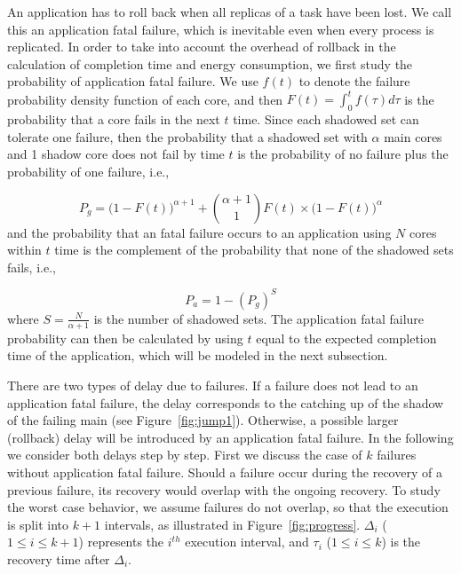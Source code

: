 An application has to roll back when all replicas of a task have been lost. We call this an application fatal failure, which is inevitable even when every process is replicated. 
In order to take into account the overhead of rollback in the calculation of completion time and energy consumption, we first 
study the probability of application fatal failure. 
We use 
$f(t)$ to denote the failure probability density function of each core, and then $F(t) = \int_0^tf(\tau)d\tau$ is the probability that a core fails in the next $t$ time. 
Since each shadowed set can tolerate one failure, 
then the probability that a shadowed set with $\alpha$ main cores and 1 shadow core does not fail by time $t$ is the probability of no failure plus the probability of one failure, i.e., 

\begin{equation}
	P_g = \Big(1-F(t)\Big)^{\alpha+1} + {{\alpha+1} \choose 1}F(t)\times \Big(1-F(t)\Big)^{\alpha}
\end{equation}
and the probability that an fatal failure occurs to an application using $N$ cores within $t$ time is the complement of the probability that
none of the shadowed sets fails, i.e.,

\begin{equation}
	P_a = 1 - ({P_g})^{S}
\end{equation}
where $S=\frac{N}{\alpha+1}$ is the number of shadowed sets.
The application fatal failure probability can then be calculated by using $t$ equal to the expected completion time of the application, which will be modeled in the next subsection.

There are two types of delay due to failures. If a failure does not lead to an application fatal failure, the delay corresponds to the catching up of the shadow of the failing main (see Figure~\ref{fig:jump1}). Otherwise, a possible larger (rollback) delay will be introduced by an application fatal failure. In the following we consider both delays step by step. 
First we discuss the case of $k$ failures without application fatal failure. Should a failure occur during the recovery of a previous failure, its recovery would overlap with the ongoing recovery. To study the worst case behavior, we assume failures do not overlap, so that the execution is split into $k+1$ intervals, as illustrated in Figure~\ref{fig:progress}. 
$\Delta_i$ ($1\le i \le k+1$) represents the $i^{th}$ execution interval, and $\tau_i$ ($1\le i \le k$) is the recovery time after $\Delta_i$. 

